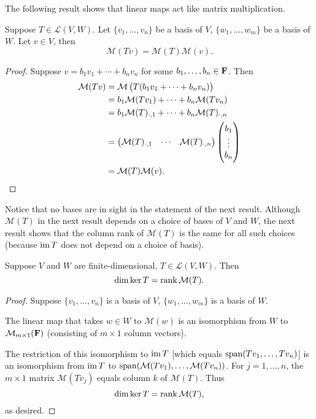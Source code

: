 The following result shows that linear maps act like matrix multiplication.

\begin{proposition}
Suppose $T\in\mathcal{L}(V,W)$. Let $\{v_1,\dots,v_n\}$ be a basis of $V$, $\{w_1,\dots,w_m\}$ be a basis of $W$. Let $v\in V$, then
\[\mathcal{M}(Tv)=\mathcal{M}(T)\mathcal{M}(v).\]
\end{proposition}

\begin{proof}
Suppose $v=b_1v_1+\cdots+b_nv_n$ for some $b_1,\dots,b_n\in\mathbf F$. Then
\begin{align*}
\mathcal{M}(Tv)&=\mathcal{M}\left(T(b_1v_1+\cdots+b_nv_n)\right)\\
&=b_1\mathcal{M}(Tv_1)+\cdots+b_n\mathcal{M}(Tv_n)\\
&=b_1\mathcal{M}(T)_{\cdot,1}+\cdots+b_n\mathcal{M}(T)_{\cdot,n}\\
&=\begin{pmatrix}
\mathcal{M}(T)_{\cdot,1}&\cdots&\mathcal{M}(T)_{\cdot,n}
\end{pmatrix}\begin{pmatrix}
b_1\\\vdots\\b_n
\end{pmatrix}\\
&=\mathcal{M}(T)\mathcal{M}(v).
\end{align*}
\end{proof}

Notice that no bases are in sight in the statement of the next result. Although $\mathcal{M}(T)$ in the next result depends on a choice of bases of $V$ and $W$, the next result shows that the column rank of $\mathcal{M}(T)$ is the same for all such choices (because $\operatorname{im} T$ does not depend on a choice of basis).

\begin{proposition}
Suppose $V$ and $W$ are finite-dimensional, $T\in\mathcal{L}(V,W)$. Then
\[\dim\ker T=\rank\mathcal{M}(T).\]
\end{proposition}

\begin{proof}
Suppose $\{v_1,\dots,v_n\}$ is a basis of $V$, $\{w_1,\dots,w_m\}$ is a basis of $W$. 

The linear map that takes $w\in W$ to $\mathcal{M}(w)$ is an isomorphism from $W$ to $\mathcal{M}_{m\times1}(\mathbf F)$ (consisting of $m\times1$ column vectors).

The restriction of this isomorphism to $\operatorname{im} T$ [which equals $\operatorname{span}(Tv_1,\dots,Tv_n)$] is an isomorphism from $\operatorname{im} T$ to $\operatorname{span}(\mathcal{M}(Tv_1),\dots,\mathcal{M}(Tv_n))$. For $j=1,\dots,n$, the $m\times1$ matrix $\mathcal{M}(Tv_j)$ equals column $k$ of $\mathcal{M}(T)$. Thus
\[\dim\ker T=\rank\mathcal{M}(T),\]
as desired.
\end{proof}

